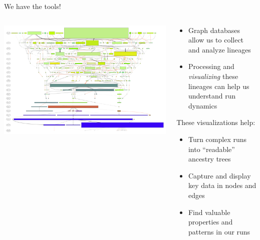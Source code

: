 \documentclass{beamer}
\begin{document}
\begin{frame}{We have the tools!}
\begin{columns}
\begin{column}{0.5\textwidth}
\center \includegraphics[width=\textwidth]{Illustrations/run0_RBM_color_full_30000.pdf} 
\end{column}
\begin{column}{0.5\textwidth}
\begin{overprint}
\begin{itemize}
    \item Graph databases allow us to collect and analyze lineages
    \item Processing and \emph{visualizing} these lineages can help us understand run dynamics
\end{itemize}
These visualizations help:
\begin{itemize}
	\item Turn complex runs into ``readable'' ancestry trees
    \item Capture and display key data in nodes and edges
    \item Find valuable properties and patterns in our runs
\end{itemize}
\end{overprint}
\end{column}
\end{columns}
\end{frame}
\end{document}
